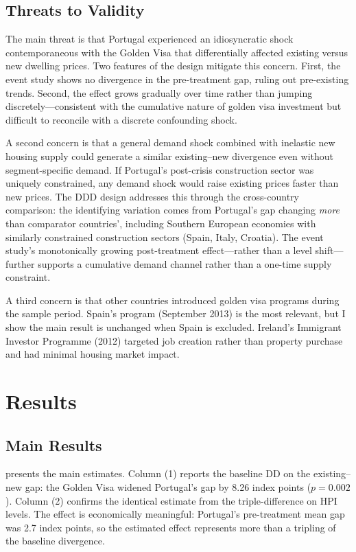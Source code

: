 \documentclass[12pt]{article}
\begin{document}
\subsection{Threats to Validity}

The main threat is that Portugal experienced an idiosyncratic shock contemporaneous with the Golden Visa that differentially affected existing versus new dwelling prices. Two features of the design mitigate this concern. First, the event study shows no divergence in the pre-treatment gap, ruling out pre-existing trends. Second, the effect grows gradually over time rather than jumping discretely---consistent with the cumulative nature of golden visa investment but difficult to reconcile with a discrete confounding shock.

A second concern is that a general demand shock combined with inelastic new housing supply could generate a similar existing--new divergence even without segment-specific demand. If Portugal's post-crisis construction sector was uniquely constrained, any demand shock would raise existing prices faster than new prices. The DDD design addresses this through the cross-country comparison: the identifying variation comes from Portugal's gap changing \textit{more} than comparator countries', including Southern European economies with similarly constrained construction sectors (Spain, Italy, Croatia). The event study's monotonically growing post-treatment effect---rather than a level shift---further supports a cumulative demand channel rather than a one-time supply constraint.

A third concern is that other countries introduced golden visa programs during the sample period. Spain's program (September 2013) is the most relevant, but I show the main result is unchanged when Spain is excluded. Ireland's Immigrant Investor Programme (2012) targeted job creation rather than property purchase and had minimal housing market impact.

\section{Results}

\subsection{Main Results}



 presents the main estimates. Column (1) reports the baseline DD on the existing--new gap: the Golden Visa widened Portugal's gap by 8.26 index points ($p = 0.002$). Column (2) confirms the identical estimate from the triple-difference on HPI levels. The effect is economically meaningful: Portugal's pre-treatment mean gap was 2.7 index points, so the estimated effect represents more than a tripling of the baseline divergence.
\end{document}
